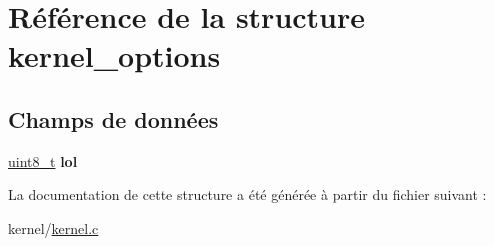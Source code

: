 \hypertarget{structkernel__options}{\section{\-Référence de la structure kernel\-\_\-options}
\label{structkernel__options}
}
\subsection*{\-Champs de données}
\begin{DoxyCompactItemize}
\item 
\hypertarget{structkernel__options_aaf8b5378f13106d9ddbc9e392e7f0367}{\hyperlink{types_8h_aba7bc1797add20fe3efdf37ced1182c5}{uint8\-\_\-t} {\bfseries lol}}\label{structkernel__options_aaf8b5378f13106d9ddbc9e392e7f0367}

\end{DoxyCompactItemize}


\-La documentation de cette structure a été générée à partir du fichier suivant \-:\begin{DoxyCompactItemize}
\item 
kernel/\hyperlink{kernel_8c}{kernel.\-c}\end{DoxyCompactItemize}
